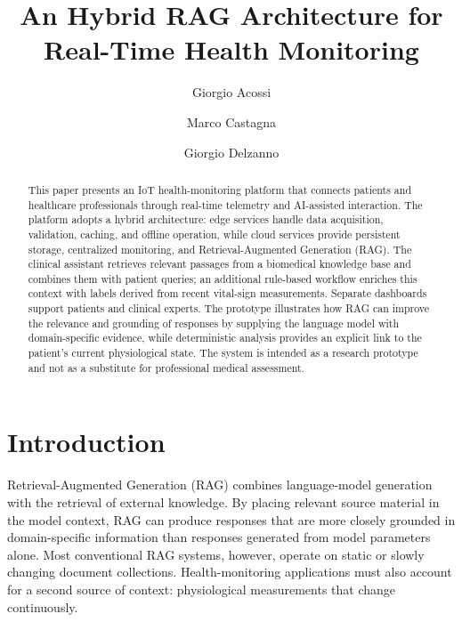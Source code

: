 \documentclass[runningheads]{llncs}
\begin{document}
\raggedbottom

\title{An Hybrid RAG Architecture for Real-Time Health Monitoring}

\author{
Giorgio Acossi
\and
Marco Castagna
\and 
Giorgio Delzanno
}



\maketitle

\begin{abstract}
This paper presents an IoT health-monitoring platform that connects patients and healthcare professionals through real-time telemetry and AI-assisted interaction. The platform adopts a hybrid architecture: edge services handle data acquisition, validation, caching, and offline operation, while cloud services provide persistent storage, centralized monitoring, and Retrieval-Augmented Generation (RAG). The clinical assistant retrieves relevant passages from a biomedical knowledge base and combines them with patient queries; an additional rule-based workflow enriches this context with labels derived from recent vital-sign measurements. Separate dashboards support patients and clinical experts. The prototype illustrates how RAG can improve the relevance and grounding of responses by supplying the language model with domain-specific evidence, while deterministic analysis provides an explicit link to the patient's current physiological state. The system is intended as a research prototype and not as a substitute for professional medical assessment.

\end{abstract}

\section{Introduction}

Retrieval-Augmented Generation (RAG) combines language-model generation with the retrieval of external knowledge. By placing relevant source material in the model context, RAG can produce responses that are more closely grounded in domain-specific information than responses generated from model parameters alone. Most conventional RAG systems, however, operate on static or slowly changing document collections. Health-monitoring applications must also account for a second source of context: physiological measurements that change continuously.
\end{document}
